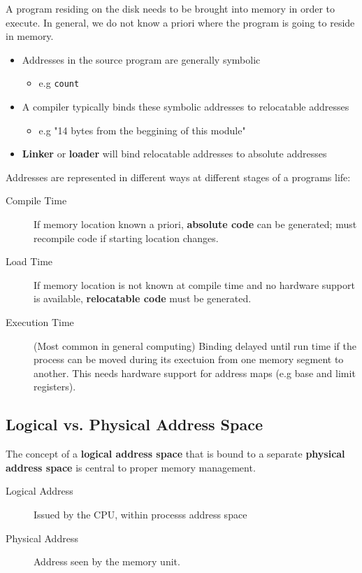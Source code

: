 \documentclass[11pt]{article}
\begin{document}
A program residing on the disk needs to be brought into memory in order to execute.
In general, we do not know a priori where the program is going to reside in memory.

\begin{itemize}
\item Addresses  in the source program are generally symbolic
\begin{itemize}
\item e.g \texttt{count}
\end{itemize}
\item A compiler typically binds these symbolic addresses to relocatable addresses
\begin{itemize}
\item e.g "14 bytes from the beggining of this module"
\end{itemize}
\item \textbf{Linker} or \textbf{loader} will bind relocatable addresses to absolute addresses
\end{itemize}
Addresses are represented in different ways at different stages of a programs life:
\begin{description}
\item[{Compile Time}] If memory location known a priori, \textbf{absolute code} can be generated; must recompile code if starting location changes.
\item[{Load Time}] If memory location is not known at compile time and no hardware support is available, \textbf{relocatable code} must be generated.
\item[{Execution Time}] (Most common in general computing) Binding delayed until run time if the process can be moved during its exectuion from one memory segment to another. This needs hardware support for address maps (e.g base and limit registers).
\end{description}

\subsection{Logical vs. Physical Address Space}
\label{sec:org799edcc}
The concept of a \textbf{logical address space} that is bound to a separate \textbf{physical address space} is central to proper memory management.
\begin{description}
\item[{Logical Address}] Issued by the CPU, within processs address space
\item[{Physical Address}] Address seen by the memory unit.
\end{description}
\end{document}
